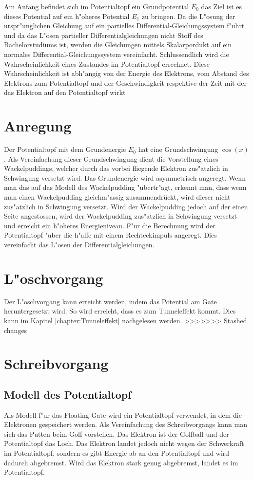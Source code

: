 \begin{refsection}
Am Anfang befindet sich im Potentialtopf ein Grundpotential $E_{0}$ das Ziel ist es dieses Potential auf ein h"oheres Potential $E_{1}$ zu bringen. Da die L"osung der urspr"unglichen Gleichung auf ein partielles Differential-Gleichungssystem f"uhrt und da das L"osen partieller Differentialgleichungen nicht Stoff des Bachelorstudiums ist, werden die Gleichungen mittels Skalarpordukt auf ein normales Differential-Gleichungssystem vereinfacht. Schlussendlich wird die Wahrscheinlichkeit eines Zustandes im Potentialtopf errechnet. Diese Wahrscheinlichkeit ist abh"angig von der Energie des Elektrons, vom Abstand des Elektrons zum Potentialtopf und der Geschwindigkeit respektive der Zeit mit der das Elektron auf den Potentialtopf wirkt 


\section{Anregung}
Der Potentialtopf mit dem Grundenergie $E_{0}$ hat eine Grundschwingung $\cos(x)$.
Als Vereinfachung dieser Grundschwingung dient die Vorstellung eines Wackelpuddings, welcher durch das vorbei fliegende Elektron zus"atzlich in Schwingung versetzt wird. 
Das Grundenergie wird asymmetrisch angeregt. Wenn man das auf das Modell des Wackelpudding "ubertr"agt, erkennt man, dass wenn man einen Wackelpudding gleichm"assig zusammendrückt, wird dieser nicht zus"atzlich in Schwingung versetzt. Wird der Wackelpudding jedoch auf der einen Seite angestossen, wird der Wackelpudding zus"atzlich in Schwingung versetzt und erreicht ein h"oheres Energieniveau.
F"ur die Berechnung wird der Potentialtopf "uber die h"alfe mit einem Rechteckimpuls angeregt. Dies vereinfacht das L"osen der Differentialgleichungen.

\section{L"oschvorgang}
Der L"oschvorgang kann erreicht werden, indem das Potential am Gate heruntergesetzt wird. So wird erreicht, dass es zum Tunneleffekt kommt. Dies kann im Kapitel \ref{chapter:Tunneleffekt} nachgelesen werden.
>>>>>>> Stashed changes


\section{Schreibvorgang}

\subsection{Modell des Potentialtopf}
Als Modell f"ur das Floating-Gate wird ein Potentialtopf verwendet,
in dem die Elektronen gespeichert werden.
Als Vereinfachung des Schreibvorgangs kann man sich das Putten beim
Golf vorstellen. Das Elektron ist der Golfball und der Potentialtopf
das Loch. Das Elektron landet jedoch nicht wegen der Schwerkraft im
Potentialtopf, sondern es gibt Energie ab an den Potentialtopf und wird
dadurch abgebremst. Wird das Elektron stark genug abgebremst, landet es
im Potentialtopf.


\end{refsection}
